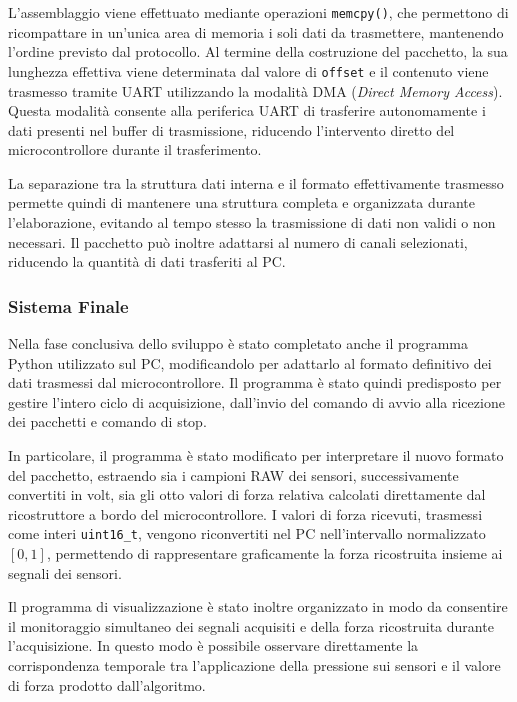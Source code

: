\documentclass[10pt, a4paper]{article}
\begin{document}
                L'assemblaggio viene effettuato mediante operazioni \texttt{memcpy()}, che permettono di ricompattare in un'unica area di memoria i soli dati da 
                trasmettere, mantenendo l'ordine previsto dal protocollo. Al termine della costruzione del pacchetto, la sua lunghezza effettiva viene determinata 
                dal valore di \texttt{offset} e il contenuto viene trasmesso tramite UART utilizzando la modalità DMA (\textit{Direct Memory Access}). 
                Questa modalità consente alla periferica UART di trasferire autonomamente i dati presenti nel buffer di trasmissione, riducendo l'intervento 
                diretto del microcontrollore durante il trasferimento.

                La separazione tra la struttura dati interna e il formato effettivamente trasmesso permette quindi di mantenere una struttura completa e 
                organizzata durante l'elaborazione, evitando al tempo stesso la trasmissione di dati non validi o non necessari. Il pacchetto può inoltre 
                adattarsi al numero di canali selezionati, riducendo la quantità di dati trasferiti al PC.

            \subsubsection{Sistema Finale}
                Nella fase conclusiva dello sviluppo è stato completato anche il programma Python utilizzato sul PC, modificandolo per adattarlo al formato 
                definitivo dei dati trasmessi dal microcontrollore. Il programma è stato quindi predisposto per gestire l'intero ciclo di acquisizione, 
                dall'invio del comando di avvio alla ricezione dei pacchetti e comando di stop.

                In particolare, il programma è stato modificato per interpretare il nuovo formato del pacchetto, estraendo sia i campioni RAW dei sensori, 
                successivamente convertiti in volt, sia gli otto valori di forza relativa calcolati direttamente dal ricostruttore a bordo del microcontrollore. 
                I valori di forza ricevuti, trasmessi come interi \texttt{uint16\_t}, vengono riconvertiti nel PC nell'intervallo normalizzato $[0,1]$, 
                permettendo di rappresentare graficamente la forza ricostruita insieme ai segnali dei sensori.

                Il programma di visualizzazione è stato inoltre organizzato in modo da consentire il monitoraggio simultaneo dei segnali acquisiti e della forza
                ricostruita durante l'acquisizione. In questo modo è possibile osservare direttamente la corrispondenza temporale tra l'applicazione della 
                pressione sui sensori e il valore di forza prodotto dall'algoritmo.
\end{document}
